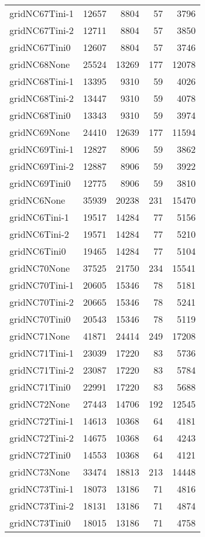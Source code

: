 \begin{longtable}{lrrrr}
gridNC67Tini-1 & 12657 & 8804 & 57 & 3796 \\
gridNC67Tini-2 & 12711 & 8804 & 57 & 3850 \\
gridNC67Tini0 & 12607 & 8804 & 57 & 3746 \\
gridNC68None & 25524 & 13269 & 177 & 12078 \\
gridNC68Tini-1 & 13395 & 9310 & 59 & 4026 \\
gridNC68Tini-2 & 13447 & 9310 & 59 & 4078 \\
gridNC68Tini0 & 13343 & 9310 & 59 & 3974 \\
gridNC69None & 24410 & 12639 & 177 & 11594 \\
gridNC69Tini-1 & 12827 & 8906 & 59 & 3862 \\
gridNC69Tini-2 & 12887 & 8906 & 59 & 3922 \\
gridNC69Tini0 & 12775 & 8906 & 59 & 3810 \\
gridNC6None & 35939 & 20238 & 231 & 15470 \\
gridNC6Tini-1 & 19517 & 14284 & 77 & 5156 \\
gridNC6Tini-2 & 19571 & 14284 & 77 & 5210 \\
gridNC6Tini0 & 19465 & 14284 & 77 & 5104 \\
gridNC70None & 37525 & 21750 & 234 & 15541 \\
gridNC70Tini-1 & 20605 & 15346 & 78 & 5181 \\
gridNC70Tini-2 & 20665 & 15346 & 78 & 5241 \\
gridNC70Tini0 & 20543 & 15346 & 78 & 5119 \\
gridNC71None & 41871 & 24414 & 249 & 17208 \\
gridNC71Tini-1 & 23039 & 17220 & 83 & 5736 \\
gridNC71Tini-2 & 23087 & 17220 & 83 & 5784 \\
gridNC71Tini0 & 22991 & 17220 & 83 & 5688 \\
gridNC72None & 27443 & 14706 & 192 & 12545 \\
gridNC72Tini-1 & 14613 & 10368 & 64 & 4181 \\
gridNC72Tini-2 & 14675 & 10368 & 64 & 4243 \\
gridNC72Tini0 & 14553 & 10368 & 64 & 4121 \\
gridNC73None & 33474 & 18813 & 213 & 14448 \\
gridNC73Tini-1 & 18073 & 13186 & 71 & 4816 \\
gridNC73Tini-2 & 18131 & 13186 & 71 & 4874 \\
gridNC73Tini0 & 18015 & 13186 & 71 & 4758 \\

\end{longtable}

